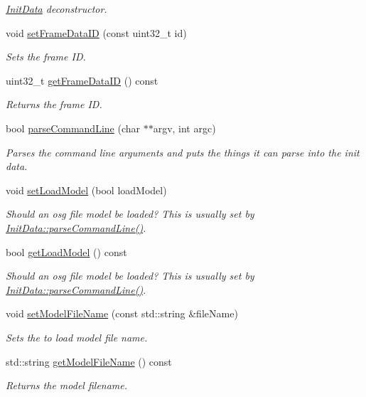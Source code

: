 \begin{CompactItemize}
\begin{CompactList}\small\item\em \hyperlink{a00011}{InitData} deconstructor. \item\end{CompactList}\item 
void \hyperlink{a00011_784dbe6a89945a5311143ca91b01c224}{setFrameDataID} (const uint32\_\-t id)
\begin{CompactList}\small\item\em Sets the frame ID. \item\end{CompactList}\item 
uint32\_\-t \hyperlink{a00011_0fed75d0be3cc9d30aa2483920dda8ec}{getFrameDataID} () const 
\begin{CompactList}\small\item\em Returns the frame ID. \item\end{CompactList}\item 
bool \hyperlink{a00011_911e15d0bc1d4e427ad574a9b9e0fff9}{parseCommandLine} (char $\ast$$\ast$argv, int argc)
\begin{CompactList}\small\item\em Parses the command line arguments and puts the things it can parse into the init data. \item\end{CompactList}\item 
void \hyperlink{a00011_de8e662e01371948b9717ffe8412ed45}{setLoadModel} (bool loadModel)
\begin{CompactList}\small\item\em Should an osg file model be loaded? This is usually set by \hyperlink{a00011_911e15d0bc1d4e427ad574a9b9e0fff9}{InitData::parseCommandLine()}. \item\end{CompactList}\item 
bool \hyperlink{a00011_98db3359b5152eebe9967b0e4cf3e29a}{getLoadModel} () const 
\begin{CompactList}\small\item\em Should an osg file model be loaded? This is usually set by \hyperlink{a00011_911e15d0bc1d4e427ad574a9b9e0fff9}{InitData::parseCommandLine()}. \item\end{CompactList}\item 
void \hyperlink{a00011_71d9d6c19244b8bf10e8fae264a2327c}{setModelFileName} (const std::string \&fileName)
\begin{CompactList}\small\item\em Sets the to load model file name. \item\end{CompactList}\item 
std::string \hyperlink{a00011_b5f311698f1dd969d0a968fb06929426}{getModelFileName} () const 
\begin{CompactList}\small\item\em Returns the model filename. \item\end{CompactList}\end{CompactItemize}
